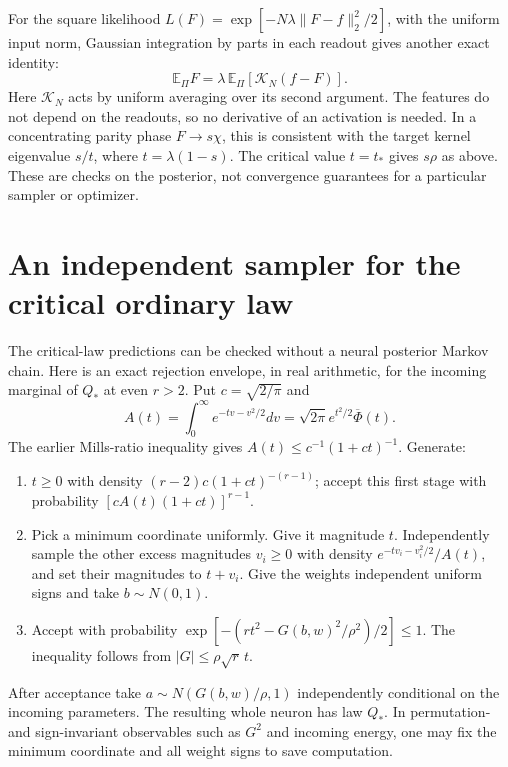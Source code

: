 \documentclass[11pt]{article}
\newcommand{\E}{\mathbb E}\newcommand{\Pp}{\mathbb P}
\begin{document}
For the square likelihood $L(F)=\exp[-N\lambda\|F-f\|_2^2/2]$,
with the uniform input norm, Gaussian integration by parts in each
readout gives another exact identity:
\[
 \E_\Pi F=\lambda\,\E_\Pi[\mathcal K_N(f-F)].               \tag{12}
\]
Here $\mathcal K_N$ acts by uniform averaging over its second argument.
The features do not depend on the readouts, so no derivative of an
activation is needed. In a concentrating parity phase $F\to s\chi$,
this is consistent with the target kernel eigenvalue $s/t$, where
$t=\lambda(1-s)$. The critical value $t=t_*$ gives $s\rho$ as above.
These are checks on the posterior, not convergence guarantees for a
particular sampler or optimizer.

\section{An independent sampler for the critical ordinary law}
The critical-law predictions can be checked without a neural posterior
Markov chain. Here is an exact rejection envelope, in real arithmetic,
for the incoming marginal of $Q_*$ at even $r>2$.
Put $c=\sqrt{2/\pi}$ and
\[
 A(t)=\int_0^\infty e^{-tv-v^2/2}dv
     =\sqrt{2\pi}e^{t^2/2}\overline\Phi(t).
\]
The earlier Mills-ratio inequality gives
$A(t)\le c^{-1}(1+ct)^{-1}$. Generate:
\begin{enumerate}
\item $t\ge0$ with density $(r-2)c(1+ct)^{-(r-1)}$;
      accept this first stage with probability
      $[cA(t)(1+ct)]^{r-1}$.
\item Pick a minimum coordinate uniformly. Give it magnitude $t$.
      Independently sample the other excess magnitudes $v_i\ge0$ with
      density $e^{-tv_i-v_i^2/2}/A(t)$, and set their magnitudes to
      $t+v_i$. Give the weights independent uniform signs and take
      $b\sim N(0,1)$.
\item Accept with probability
      $\exp[-(rt^2-G(b,w)^2/\rho^2)/2]\le1$.
      The inequality follows from $|G|\le\rho\sqrt r\,t$.
\end{enumerate}
After acceptance take $a\sim N(G(b,w)/\rho,1)$ independently
conditional on the incoming parameters. The resulting whole neuron has
law $Q_*$. In permutation- and sign-invariant observables such as $G^2$
and incoming energy, one may fix the minimum coordinate and all weight
signs to save computation.
\end{document}
